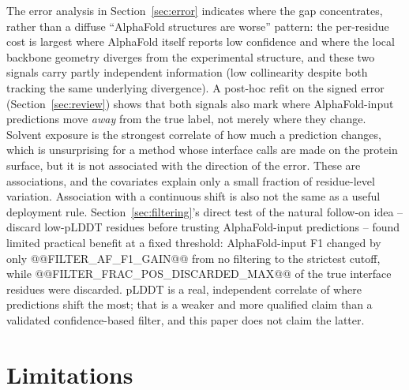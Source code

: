 \documentclass[10pt]{article}
\begin{document}
The error analysis in Section~\ref{sec:error} indicates where the gap
concentrates, rather than a diffuse ``AlphaFold structures are worse''
pattern: the per-residue cost is largest where AlphaFold itself reports low
confidence and where the local backbone geometry diverges from the
experimental structure, and these two signals carry partly independent
information (low collinearity despite both tracking the same underlying
divergence). A post-hoc refit on the signed error (Section~\ref{sec:review}) shows that both signals
also mark where AlphaFold-input predictions move \emph{away} from the true
label, not merely where they change. Solvent exposure is the strongest
correlate of how much a prediction changes, which is unsurprising for a
method whose interface calls are made on the protein surface, but it is not
associated with the direction of the error. These are associations, and the
covariates explain only a small fraction of residue-level variation. Association with a continuous shift is also not the same as a useful
deployment rule. Section~\ref{sec:filtering}'s direct test of the natural
follow-on idea -- discard low-pLDDT residues before trusting AlphaFold-input
predictions -- found limited practical benefit at a fixed threshold:
AlphaFold-input F1 changed by only @@FILTER_AF_F1_GAIN@@ from no filtering to
the strictest cutoff, while @@FILTER_FRAC_POS_DISCARDED_MAX@@ of the true
interface residues were discarded. pLDDT is a real, independent correlate of
where predictions shift the most; that is a weaker and more qualified claim
than a validated confidence-based filter, and this paper does not claim the
latter.

\section{Limitations}
\end{document}
